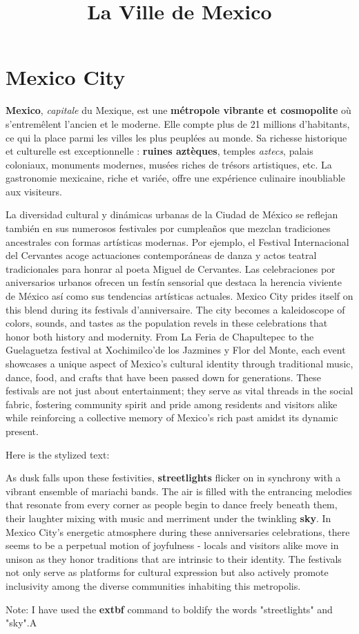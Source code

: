 \documentclass[12pt, a4paper]{article}
\title{La Ville de Mexico}
\author{}
\date{}
\begin{document}
   \maketitle

\section*{Mexico City}

\textbf{Mexico}, \textit{capitale} du Mexique, est une \textbf{métropole vibrante et cosmopolite} où s'entremêlent l'ancien et le moderne. Elle compte plus de 21 millions d'habitants, ce qui la place parmi les villes les plus peuplées au monde. Sa richesse historique et culturelle est exceptionnelle : \textbf{ruines aztèques}, temples \textit{aztecs}, palais coloniaux, monuments modernes, musées riches de trésors artistiques, etc. La gastronomie mexicaine, riche et variée, offre une expérience culinaire inoubliable aux visiteurs.

La diversidad cultural y dinámicas urbanas de la Ciudad de México se reflejan también en sus numerosos festivales por cumpleaños que mezclan tradiciones ancestrales con formas artísticas modernas. Por ejemplo, el Festival Internacional del Cervantes acoge actuaciones contemporáneas de danza y actos teatral tradicionales para honrar al poeta Miguel de Cervantes. Las celebraciones por aniversarios urbanos ofrecen un festín sensorial que destaca la herencia viviente de México así como sus tendencias artísticas actuales.
Mexico City prides itself on this blend during its festivals d’anniversaire. The city becomes a kaleidoscope of colors, sounds, and tastes as the population revels in these celebrations that honor both history and modernity. From La Feria de Chapultepec to the Guelaguetza festival at Xochimilco'de los Jazmines y Flor del Monte, each event showcases a unique aspect of Mexico’s cultural identity through traditional music, dance, food, and crafts that have been passed down for generations. These festivals are not just about entertainment; they serve as vital threads in the social fabric, fostering community spirit and pride among residents and visitors alike while reinforcing a collective memory of Mexico’s rich past amidst its dynamic present.

Here is the stylized text:

As dusk falls upon these festivities, \textbf{streetlights} flicker on in synchrony with a vibrant ensemble of mariachi bands. The air is filled with the entrancing melodies that resonate from every corner as people begin to dance freely beneath them, their laughter mixing with music and merriment under the twinkling \textbf{sky}. In Mexico City's energetic atmosphere during these anniversaries celebrations, there seems to be a perpetual motion of joyfulness - locals and visitors alike move in unison as they honor traditions that are intrinsic to their identity. The festivals not only serve as platforms for cultural expression but also actively promote inclusivity among the diverse communities inhabiting this metropolis.

Note: I have used the \textbf{extbf} command to boldify the words "streetlights" and "sky".A

  
\end{document}
